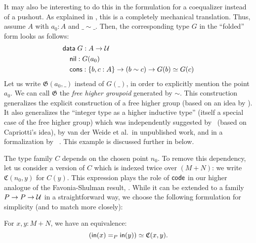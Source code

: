 It may also be interesting to do this in the formulation for a coequalizer
instead of a pushout.
As explained in , this is a completely mechanical translation.
Thus, assume $A$ with $a_0 : A$ and $\_\sim\_$.
Then, the corresponding type $G$ in the ``folded'' form looks as follows:
\begin{equation} \label{eq:free-higher-groupoid-nice}
 \begin{alignedat}{1}
  & \mathsf{data} \; G : A \to \mathcal{U} \\
   & \quad \mathsf{nil} : G(a_0) \\
   & \quad \mathsf{cons} : \{b,c:A\} \to (b \sim c) \to G(b) \simeq G(c)
 \end{alignedat}
\end{equation}
Let us write $\mathfrak G(a_0, \_)$ instead of $G(\_)$, in order to explicitly
mention the point $a_0$.
We can call $\mathfrak G$ the \emph{free higher groupoid} generated by $\sim$.
This construction generalizes the explicit construction of a free higher group
(based on an idea by \citet{kraus_FHG}).
It also generalizes the ``integer type as a higher inductive type''
(itself a special case of the free higher group) which was independently suggested
by~\citet{gun:squid} (based on Capriotti's idea),
by van der Weide et al.\ in unpublished work, and in a formalization by
~\citet{Evan:Squid}.
This example is discussed further in  below.

The type family $C$ depends on the chosen point $n_0$.
To remove this dependency, let us consider a version of $C$ which is indexed
twice over $(M+N)$:
we write $\mathfrak C(n_0, y)$ for $C(y)$.
This expression plays the role of $\mathsf{code}$ in our higher analogue of
the Favonia-Shulman result, .
While it can be extended to a family $P \to P \to \mathcal{U}$ in a straightforward way,
we choose the following formulation for simplicity
(and to match  more closely):

\begin{thm}\label{thm:paths-higher-SvK}
 For $x,y : M+N$, we have an equivalence:
 \begin{equation} \label{eq:thm-higher-svk}
  \left(\mathsf{in}(x) =_P \mathsf{in}(y)\right) \simeq \mathfrak C (x,y).
 \end{equation}
\end{thm}

